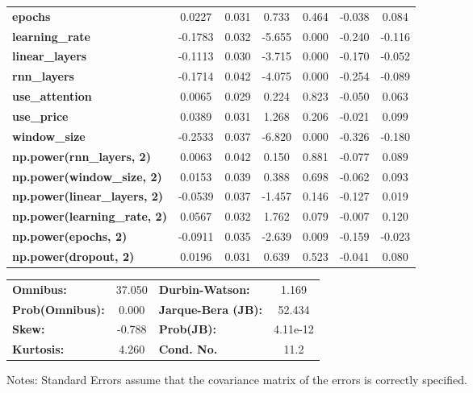 \begin{center}
\begin{tabular}{lcccccc}
\textbf{epochs}                            &       0.0227  &        0.031     &     0.733  &         0.464        &       -0.038    &        0.084     \\
\textbf{learning\_rate}                    &      -0.1783  &        0.032     &    -5.655  &         0.000        &       -0.240    &       -0.116     \\
\textbf{linear\_layers}                    &      -0.1113  &        0.030     &    -3.715  &         0.000        &       -0.170    &       -0.052     \\
\textbf{rnn\_layers}                       &      -0.1714  &        0.042     &    -4.075  &         0.000        &       -0.254    &       -0.089     \\
\textbf{use\_attention}                    &       0.0065  &        0.029     &     0.224  &         0.823        &       -0.050    &        0.063     \\
\textbf{use\_price}                        &       0.0389  &        0.031     &     1.268  &         0.206        &       -0.021    &        0.099     \\
\textbf{window\_size}                      &      -0.2533  &        0.037     &    -6.820  &         0.000        &       -0.326    &       -0.180     \\
\textbf{np.power(rnn\_layers, 2)}          &       0.0063  &        0.042     &     0.150  &         0.881        &       -0.077    &        0.089     \\
\textbf{np.power(window\_size, 2)}         &       0.0153  &        0.039     &     0.388  &         0.698        &       -0.062    &        0.093     \\
\textbf{np.power(linear\_layers, 2)}       &      -0.0539  &        0.037     &    -1.457  &         0.146        &       -0.127    &        0.019     \\
\textbf{np.power(learning\_rate, 2)}       &       0.0567  &        0.032     &     1.762  &         0.079        &       -0.007    &        0.120     \\
\textbf{np.power(epochs, 2)}               &      -0.0911  &        0.035     &    -2.639  &         0.009        &       -0.159    &       -0.023     \\
\textbf{np.power(dropout, 2)}              &       0.0196  &        0.031     &     0.639  &         0.523        &       -0.041    &        0.080     \\
\bottomrule
\end{tabular}
\begin{tabular}{lclc}
\textbf{Omnibus:}       & 37.050 & \textbf{  Durbin-Watson:     } &    1.169  \\
\textbf{Prob(Omnibus):} &  0.000 & \textbf{  Jarque-Bera (JB):  } &   52.434  \\
\textbf{Skew:}          & -0.788 & \textbf{  Prob(JB):          } & 4.11e-12  \\
\textbf{Kurtosis:}      &  4.260 & \textbf{  Cond. No.          } &     11.2  \\
\bottomrule
\end{tabular}
\end{center}

Notes: \newline
 [1] Standard Errors assume that the covariance matrix of the errors is correctly specified.